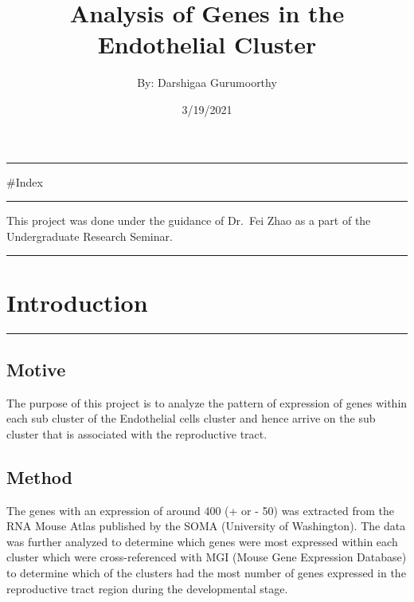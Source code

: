 \documentclass[
]{book}
\title{Analysis of Genes in the Endothelial Cluster}
\author{By: Darshigaa Gurumoorthy}
\date{3/19/2021}
\begin{document}
\maketitle

{
\setcounter{tocdepth}{1}
\tableofcontents
}
\begin{center}\rule{0.5\linewidth}{0.5pt}\end{center}

\#Index

\begin{center}\rule{0.5\linewidth}{0.5pt}\end{center}

This project was done under the guidance of Dr.~Fei Zhao as a part of the Undergraduate Research Seminar.

\begin{center}\rule{0.5\linewidth}{0.5pt}\end{center}

\hypertarget{introduction}{%
\chapter{Introduction}\label{introduction}}

\begin{center}\rule{0.5\linewidth}{0.5pt}\end{center}

\hypertarget{motive}{%
\section{Motive}\label{motive}}

The purpose of this project is to analyze the pattern of expression of genes within each sub cluster of the Endothelial cells cluster and hence arrive on the sub cluster that is associated with the reproductive tract.

\hypertarget{method}{%
\section{Method}\label{method}}

The genes with an expression of around 400 (+ or - 50) was extracted from the RNA Mouse Atlas published by the SOMA (University of Washington). The data was further analyzed to determine which genes were most expressed within each cluster which were cross-referenced with MGI (Mouse Gene Expression Database) to determine which of the clusters had the most number of genes expressed in the reproductive tract region during the developmental stage.
\end{document}
